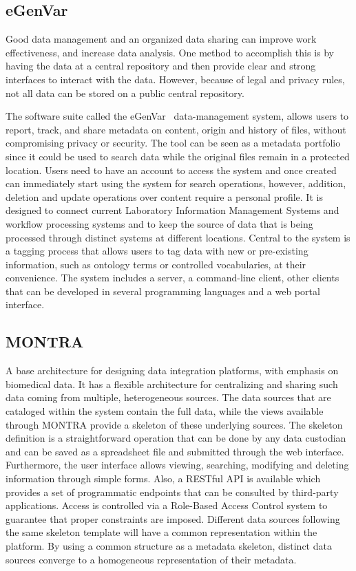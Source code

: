 \subsection*{eGenVar}

Good data management and an organized data sharing can improve work effectiveness, and increase data analysis.
One method to accomplish this is by having the data at a central repository and then provide clear and strong interfaces to interact with the data.
However, because of legal and privacy rules, not all data can be stored on a public central repository.

The software suite called the eGenVar~\cite{egenvar} data-management system, allows users to report, track, and share metadata on content, origin and history of files, without compromising privacy or security.
The tool can be seen as a metadata portfolio since it could be used to search data while the original files remain in a protected location.
Users need to have an account to access the system and once created can immediately start using the system for search operations, however, addition, deletion and update operations over content require a personal profile.
It is designed to connect current Laboratory Information Management Systems and workflow processing systems and to keep the source of data that is being processed through distinct systems at different locations.
Central to the system is a tagging process that allows users to tag data with new or pre-existing information, such as ontology terms or controlled vocabularies, at their convenience.
The system includes a server, a command-line client, other clients that can be developed in several programming languages and a web portal interface.

\subsection*{MONTRA}
A base architecture for designing data integration platforms, with emphasis on
biomedical data.
It has a flexible architecture for centralizing and sharing such data coming from
multiple, heterogeneous sources.
The data sources that are cataloged within the system contain the full data, while the
views available through MONTRA\cite{montra} provide a skeleton of these underlying sources.
The skeleton definition is a straightforward operation that can be done by any data
custodian and can be saved as a spreadsheet file and submitted through the web
interface.
Furthermore, the user interface allows viewing, searching, modifying and deleting
information through simple forms.
Also, a RESTful API is available which provides a set of programmatic endpoints that
can be consulted by third-party applications.
Access is controlled via a Role-Based Access Control system to guarantee that proper
constraints are imposed.
Different data sources following the same skeleton template will have a common
representation within the platform.
By using a common structure as a metadata skeleton, distinct data sources converge to a
homogeneous representation of their metadata.

